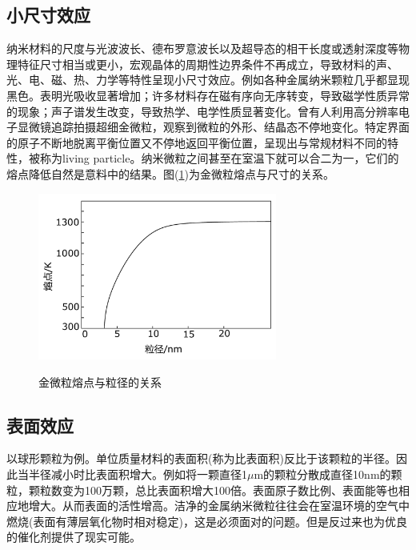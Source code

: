 \documentclass[a4paper]{article}
\begin{document}
\subsection{小尺寸效应}
纳米材料的尺度与光波波长、德布罗意波长以及超导态的相干长度或透射深度等物理特征尺寸相当或更小，宏观晶体的周期性边界条件不再成立，导致材料的声、光、电、磁、热、力学等特性呈现小尺寸效应。例如各种金属纳米颗粒几乎都显现黑色。表明光吸收显著增加；许多材料存在磁有序向无序转变，导致磁学性质异常的现象；声子谱发生改变，导致热学、电学性质显著变化。曾有人利用高分辨率电子显微镜追踪拍摄超细金微粒，观察到微粒的外形、结晶态不停地变化。特定界面的原子不断地脱离平衡位置又不停地返回平衡位置，呈现出与常规材料不同的特性，被称为living particle。纳米微粒之间甚至在室温下就可以合二为一，它们的熔点降低自然是意料中的结果。图(\ref{fig2})为金微粒熔点与尺寸的关系。
\begin{figure}[!h]
\centering
\includegraphics[width=0.7\textwidth]{fig/fig2.pdf}\\
\caption{金微粒熔点与粒径的关系}\label{fig2}
\end{figure}

\subsection{表面效应}
以球形颗粒为例。单位质量材料的表面积(称为比表面积)反比于该颗粒的半径。因此当半径减小时比表面积增大。例如将一颗直径1$\mu$m的颗粒分散成直径10nm的颗粒，颗粒数变为100万颗，总比表面积增大100倍。表面原子数比例、表面能等也相应地增大。从而表面的活性增高。洁净的金属纳米微粒往往会在室温环境的空气中燃烧(表面有薄层氧化物时相对稳定)，这是必须面对的问题。但是反过来也为优良的催化剂提供了现实可能。
\end{document}
